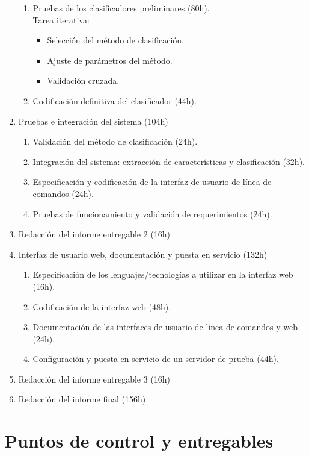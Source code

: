 \documentclass[12pt,bibliography=oldstyle,DIV=14,parskip=full-,titlepage]{scrartcl}
\begin{document}
\begin{enumerate}
\begin{enumerate}
  \item Pruebas de los clasificadores preliminares (80h).\\
    Tarea iterativa:
    \begin{itemize}
    \item Selección del método de clasificación.
    \item Ajuste de parámetros del método.
    \item Validación cruzada.
    \end{itemize}
  \item Codificación definitiva del clasificador (44h).
  \end{enumerate}
\item Pruebas e integración del sistema (104h)
  \begin{enumerate}
  \item Validación del método de clasificación (24h).
  \item Integración del sistema: extracción de características y
    clasificación (32h).
  \item Especificación y codificación de la interfaz de usuario de
    línea de comandos (24h).
  \item Pruebas de funcionamiento y validación de requerimientos (24h).
  \end{enumerate}
\item Redacción del informe entregable 2 (16h)
\item Interfaz de usuario web, documentación y puesta en servicio (132h)
  \begin{enumerate}
  \item Especificación de los lenguajes/tecnologías a utilizar en la
    interfaz web (16h).
  \item Codificación de la interfaz web (48h).
  \item Documentación de las interfaces de usuario de línea de
    comandos y web (24h).
  \item Configuración y puesta en servicio de un servidor de prueba
    (44h).
  \end{enumerate}
\item Redacción del informe entregable 3 (16h)
\item Redacción del informe final (156h)
\end{enumerate}
%
%
\section{Puntos de control y entregables}
\end{document}
